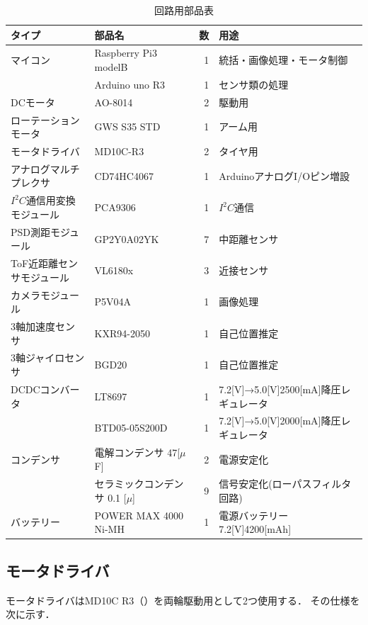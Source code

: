 \documentclass[11pt,a4]{jsarticle}
\begin{document}
    \begin{table}[h]
      \centering
      \caption{回路用部品表}
      \begin{tabular}{|l|l|r||l|} \hline
        タイプ & 部品名 & 数 & 用途 \\ \hline \hline
         マイコン & Raspberry Pi3 modelB& 1& 統括・画像処理・モータ制御 \\ \cline{2-4}
       　　& Arduino uno R3& 1 & センサ類の処理 \\ \hline
         DCモータ & AO-8014 & 2 & 駆動用 \\ \hline
         ローテーションモータ & GWS S35 STD & 1&アーム用  \\ \hline
        モータドライバ& MD10C-R3 & 2& タイヤ用 \\ \hline
       アナログマルチプレクサ & CD74HC4067 & 1 & ArduinoアナログI/Oピン増設 \\ \hline
        $I^2 C$通信用変換モジュール&PCA9306&1&$I^2 C$通信\\ \hline
         PSD測距モジュール& GP2Y0A02YK &7&中距離センサ\\ \hline
          ToF近距離センサモジュール& VL6180x&3&近接センサ \\ \hline
         カメラモジュール&P5V04A&1&画像処理\\ \hline
         3軸加速度センサ&KXR94-2050&1&自己位置推定\\ \hline
         3軸ジャイロセンサ&BGD20&1&自己位置推定\\ \hline
        DCDCコンバータ&LT8697&1& 7.2[V]→5.0[V]2500[mA]降圧レギュレータ\\ \cline{2-4}
           &BTD05-05S200D&1&7.2[V]→5.0[V]2000[mA]降圧レギュレータ\\ \hline
        コンデンサ&電解コンデンサ 47[$\mu$F]&2&電源安定化\\ \cline{2-4}
                &セラミックコンデンサ 0.1 [$\mu$]&9&信号安定化(ローパスフィルタ回路)\\ \hline
       バッテリー&POWER MAX 4000 Ni-MH&1&電源バッテリー 7.2[V]4200[mAh]\\ \hline

      \end{tabular}
      \label{tab:c_parts}
    \end{table}


  \subsection{モータドライバ}
    モータドライバはMD10C R3（）を両輪駆動用として2つ使用する．
    その仕様を次に示す．
\end{document}

